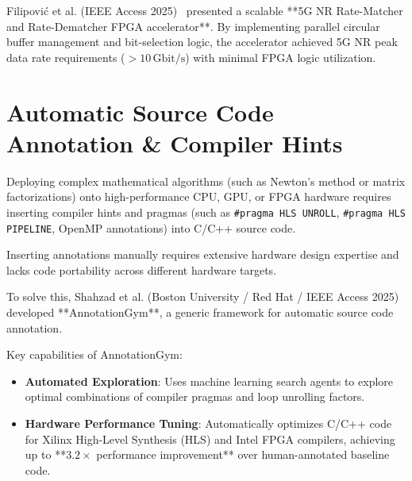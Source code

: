 Filipović et al. (IEEE Access 2025)~\cite{filipovic2025scalable} presented a scalable **5G NR Rate-Matcher and Rate-Dematcher FPGA accelerator**. By implementing parallel circular buffer management and bit-selection logic, the accelerator achieved 5G NR peak data rate requirements ($>10\,\text{Gbit/s}$) with minimal FPGA logic utilization.

\section{Automatic Source Code Annotation \& Compiler Hints}
Deploying complex mathematical algorithms (such as Newton's method or matrix factorizations) onto high-performance CPU, GPU, or FPGA hardware requires inserting compiler hints and pragmas (such as \texttt{\#pragma HLS UNROLL}, \texttt{\#pragma HLS PIPELINE}, OpenMP annotations) into C/C++ source code.

Inserting annotations manually requires extensive hardware design expertise and lacks code portability across different hardware targets.

To solve this, Shahzad et al. (Boston University / Red Hat / IEEE Access 2025)~\cite{shahzad2025annotationgym} developed **AnnotationGym**, a generic framework for automatic source code annotation.

Key capabilities of AnnotationGym:
\begin{itemize}[leftmargin=*]
    \item \textbf{Automated Exploration}: Uses machine learning search agents to explore optimal combinations of compiler pragmas and loop unrolling factors.
    \item \textbf{Hardware Performance Tuning}: Automatically optimizes C/C++ code for Xilinx High-Level Synthesis (HLS) and Intel FPGA compilers, achieving up to **$3.2\times$ performance improvement** over human-annotated baseline code.
\end{itemize}
